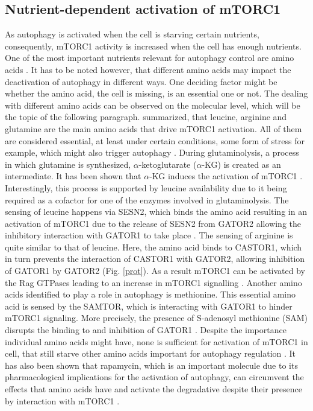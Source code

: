 \documentclass[12pt]{article} %
\begin{document}
\begin{linenumbers*}
\subsection{Nutrient-dependent activation of mTORC1}
As autophagy is activated when the cell is starving certain nutrients, consequently, mTORC1 activity is increased when the cell has enough nutrients. %
One of the most important nutrients relevant for autophagy control are amino acids
\citep{Carroll2017}. 
It has to be noted however, that different amino acids may impact the deactivation of autophagy in different ways. One deciding factor might be whether the amino acid, the cell is missing, is an essential one or not. The dealing with different amino acids can be observed on the molecular level, which will be the topic of the following paragraph.
\cite{Carroll2017} summarized, that leucine, arginine and glutamine are the main amino acids that drive mTORC1 activation. All of them are considered essential, at least under certain conditions, some form of stress for example, which might also trigger autophagy
\citep{Reeds2000, Fuerst2004}.
During glutaminolysis, a process in which glutamine is synthesized, $\alpha$-ketoglutarate ($\alpha$-KG) is created as an intermediate. It has been shown that $\alpha$-KG induces the activation of mTORC1 \citep{Carroll2017, RabanalRuiz2018}.
Interestingly, this process is supported by leucine availability due to it being required as a cofactor for one of the enzymes involved in glutaminolysis. The sensing of leucine happens via SESN2, which binds the amino acid resulting in an activation of mTORC1 due to the release of SESN2  from GATOR2 allowing the inhibitory interaction with GATOR1 to take place \citep{Carroll2017, RabanalRuiz2018}.
The sensing of arginine is quite similar to that of leucine. Here, the amino acid binds to CASTOR1, which in turn prevents the interaction of CASTOR1 with GATOR2, allowing inhibition of GATOR1 by GATOR2 (Fig. \ref{prot}). As a result mTORC1 can be activated by the Rag GTPases leading to an increase in mTORC1 signalling \citep{Carroll2017,Carroll2016,RabanalRuiz2018}.
Another amino acids identified to play a role in autophagy is methionine. This essential amino acid is sensed by the SAMTOR, which is interacting with GATOR1 to hinder mTORC1 signaling. More precisely, the presence of S-adenosyl methionine (SAM) disrupts the binding to and inhibition of GATOR1 \citep{Gu2017}.
Despite the importance individual amino acids might have, none is sufficient for activation of mTORC1 in cell, that still starve other amino acids important for autophagy regulation \citep{Noda2017}.
It has also been shown that rapamycin, which is an important molecule due to its pharmacological implications for the activation of autophagy, can circumvent the effects that amino acids have and activate the degradative despite their presence by interaction with mTORC1 \citep{Noda2017}.


\end{linenumbers*}
\end{document}
